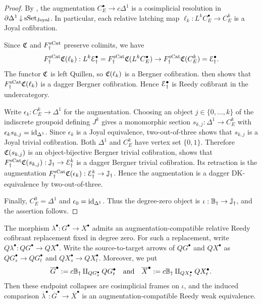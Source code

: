 \documentclass[a4paper,dvipdfmx,11pt]{amsart}
\begin{document}
\begin{proof}
  By \cite[Proposition~4.5 (b)--(d)]{DS11},
  the augmentation $C_E^{\bullet}\to c\Delta^1$ is a cosimplicial resolution in $\partial\Delta^1\mathbin{\downarrow}\mathrm{sSet}_{\mathrm{Joyal}}$.
  In particular, each relative latching map $\ell_k:L^kC_E^{\bullet}\to C_E^k$ is a Joyal cofibration.

  Since $\mathfrak{C}$ and $F_{\dag}^{\mathrm{sCat}}$ preserve colimits, we have 
  \begin{align}
    F_{\dag}^{\mathrm{sCat}}\mathfrak{C}(\ell_k):
    L^k\mathcal{E}^{\bullet}_{\dag} 
    = 
    F_{\dag}^{\mathrm{sCat}}\mathfrak{C}(L^kC_E^{\bullet})
    \to
    F_{\dag}^{\mathrm{sCat}}\mathfrak{C}(C_E^k)
    = 
    \mathcal{E}^{\bullet}_{\dag}.
  \end{align}
  The functor $\mathfrak{C}$ is left Quillen, so $\mathfrak{C}(\ell_k)$ is a Bergner cofibration.
  \Cite[Lemma~3.2.7 (1)]{Aka26} then shows that $F_{\dag}^{\mathrm{sCat}}\mathfrak{C}(\ell_k)$ is a dagger Bergner cofibration.
  Hence $\mathcal{E}^{\bullet}_{\dag}$ is Reedy cofibrant in the undercategory.

  Write $\epsilon_k:C_E^k\to\Delta^1$ for the augmentation.
  Choosing an object $j\in\{0,\ldots,k\}$ of the indiscrete groupoid defining $J^k$ gives a monomorphic section $s_{k,j}: \Delta^1 \to C_E^k$ with $\epsilon_ks_{k,j} = \operatorname{id}_{\Delta^1}$.
  Since $\epsilon_k$ is a Joyal equivalence, two-out-of-three shows that $s_{k,j}$ is a Joyal trivial cofibration.
  Both $\Delta^1$ and $C_E^k$ have vertex set $\{0,1\}$.
  Therefore $\mathfrak{C}(s_{k,j})$ is an object-bijective Bergner trivial cofibration, \cite[Lemma~3.2.7 (2)]{Aka26} shows that $F_{\dag}^{\mathrm{sCat}}\mathfrak{C}(s_{k,j}):\mathbb{J}_{\dag}\to\mathcal{E}^k_{\dag}$ is a dagger Bergner trivial cofibration.
  Its retraction is the augmentation $F_{\dag}^{\mathrm{sCat}}\mathfrak{C}(\epsilon_k): \mathcal{E}^k_{\dag}\to\mathbb{J}_{\dag}$.
  Hence the augmentation is a dagger DK-equivalence by two-out-of-three.

  Finally, $C_E^0=\Delta^1$ and $\epsilon_0=\operatorname{id}_{\Delta^1}$.
  Thus the degree-zero object is $\iota:\mathbb{B}_{\dag}\to\mathbb{J}_{\dag}$, and the assertion follows.
\end{proof}

\begin{lemma}\label{jt.lem.lambda-relative-arrows}
  The morphism
  $\lambda^{\bullet}:G^{\bullet}\to X^{\bullet}$
  admits an augmentation-compatible relative Reedy cofibrant replacement fixed in degree zero.
  For such a replacement, write
  $Q\lambda^{\bullet}:QG^{\bullet}\to QX^{\bullet}$.
  Write the source-to-target arrows of $QG^{\bullet}$ and $QX^{\bullet}$ as $QG_s^{\bullet}\to QG_t^{\bullet}$ and $QX_s^{\bullet}\to QX_t^{\bullet}$.
  Moreover, we put
  \begin{align}
    \overline G^{\bullet}
    :=c\mathbb{B}_{\dag} \amalg_{QG_s^{\bullet}} QG_t^{\bullet}
    \quad \text{and} \quad
    \overline X^{\bullet}
    := 
    c\mathbb{B}_{\dag} \amalg_{QX_s^{\bullet}} QX_t^{\bullet}.
  \end{align}
  Then these endpoint collapses are cosimplicial frames on $\iota$, and the induced comparison $\overline\lambda^{\bullet}: \overline G^{\bullet} \to \overline X^{\bullet}$ is an augmentation-compatible Reedy weak equivalence.
\end{lemma}
\end{document}
